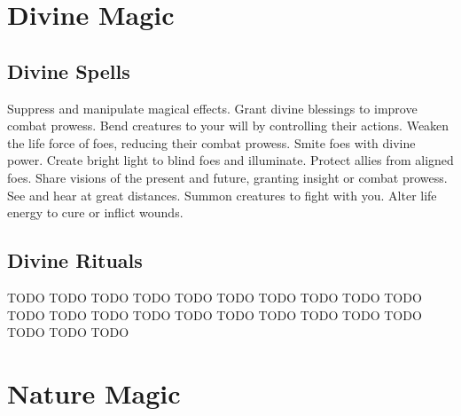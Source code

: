 \section{Divine Magic}\label{Divine Magic}
\subsection{Divine Spells}\label{Divine Spells}
\begin{spelllist}
 Suppress and manipulate magical effects.
 Grant divine blessings to improve combat prowess.
 Bend creatures to your will by controlling their actions.
 Weaken the life force of foes, reducing their combat prowess.
 Smite foes with divine power.
 Create bright light to blind foes and illuminate.
 Protect allies from aligned foes.
 Share visions of the present and future, granting insight or combat prowess.
 See and hear at great distances.
 Summon creatures to fight with you.
 Alter life energy to cure or inflict wounds.
\end{spelllist}
\subsection{Divine Rituals}\label{Divine Rituals}
\begin{spelllist}
 TODO
 TODO
 TODO
 TODO
 TODO
 TODO
 TODO
 TODO
 TODO
 TODO
 TODO
 TODO
 TODO
 TODO
 TODO
 TODO
 TODO
 TODO
 TODO
 TODO
 TODO
 TODO
 TODO
\end{spelllist}
\small
\section{Nature Magic}\label{Nature Magic}
